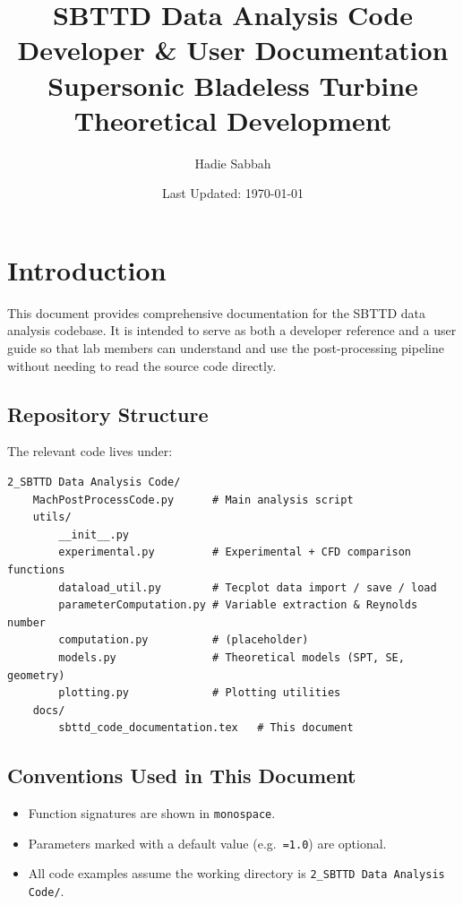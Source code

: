 \documentclass[11pt, letterpaper]{article}
\title{
    \textbf{SBTTD Data Analysis Code} \\[0.3em]
    \large Developer \& User Documentation \\[0.5em]
    \normalsize Supersonic Bladeless Turbine Theoretical Development
}
\author{Hadie Sabbah}
\date{Last Updated: \today}
\begin{document}
\maketitle
\tableofcontents
\newpage

\section{Introduction}

This document provides comprehensive documentation for the SBTTD data
analysis codebase. It is intended to serve as both a developer reference
and a user guide so that lab members can understand and use the
post-processing pipeline without needing to read the source code directly.

\subsection{Repository Structure}

The relevant code lives under:

\begin{verbatim}
2_SBTTD Data Analysis Code/
    MachPostProcessCode.py      # Main analysis script
    utils/
        __init__.py
        experimental.py         # Experimental + CFD comparison functions
        dataload_util.py        # Tecplot data import / save / load
        parameterComputation.py # Variable extraction & Reynolds number
        computation.py          # (placeholder)
        models.py               # Theoretical models (SPT, SE, geometry)
        plotting.py             # Plotting utilities
    docs/
        sbttd_code_documentation.tex   # This document
\end{verbatim}

\subsection{Conventions Used in This Document}

\begin{itemize}[nosep]
    \item Function signatures are shown in \texttt{monospace}.
    \item Parameters marked with a default value (e.g.\ \texttt{=1.0})
          are optional.
    \item All code examples assume the working directory is
          \texttt{2\_SBTTD Data Analysis Code/}.
\end{itemize}
\end{document}
